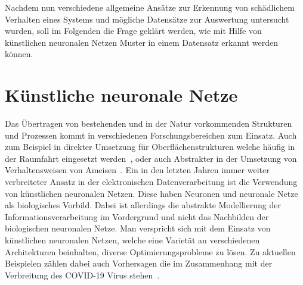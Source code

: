                 Nachdem nun verschiedene allgemeine Ansätze zur Erkennung von schädlichem Verhalten eines Systems und mögliche Datensätze zur Auswertung untersucht wurden,
                soll im Folgenden die Frage geklärt werden, wie mit Hilfe von künstlichen neuronalen Netzen Muster in einem Datensatz erkannt werden können.

    \section{Künstliche neuronale Netze}\label{sec:KNN}        
        Das Übertragen von bestehenden und in der Natur vorkommenden Strukturen und Prozessen kommt in verschiedenen Forschungsbereichen zum Einsatz.
        Auch zum Beispiel in direkter Umsetzung für Oberflächenstrukturen welche häufig in der Raumfahrt eingesetzt werden~\cite{GECKO}, oder auch Abstrakter in der Umsetzung von Verhaltensweisen von Ameisen~\cite{ANT}.
        Ein in den letzten Jahren immer weiter verbreiteter Ansatz in der elektronischen Datenverarbeitung ist die Verwendung von künstlichen neuronalen Netzen.
        Diese haben Neuronen und neuronale Netze als biologisches Vorbild.
        Dabei ist allerdings die abstrakte Modellierung der Informationsverarbeitung im Vordergrund und nicht das Nachbilden der biologischen neuronalen Netze.
        Man verspricht sich mit dem Einsatz von künstlichen neuronalen Netzen, welche eine Varietät an verschiedenen Architekturen beinhalten, diverse Optimierungsprobleme zu lösen.
        Zu aktuellen Beispielen zählen dabei auch Vorhersagen die im Zusammenhang mit der Verbreitung des COVID-19 Virus stehen~\cite{COVID1, COVID2, COVID3}.
        
